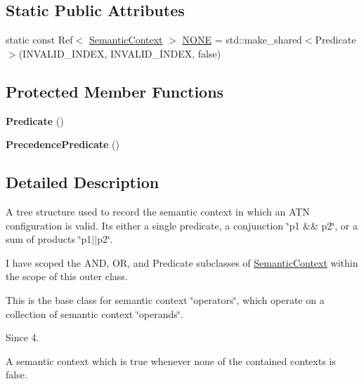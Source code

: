 \subsection*{Static Public Attributes}
\begin{DoxyCompactItemize}
\item 
static const Ref$<$ \hyperlink{classantlr4_1_1atn_1_1SemanticContext}{Semantic\+Context} $>$ \hyperlink{classantlr4_1_1atn_1_1SemanticContext_a1c9db994b89d06e9d8969e78050aeff5}{N\+O\+NE} = std\+::make\+\_\+shared$<$Predicate$>$(I\+N\+V\+A\+L\+I\+D\+\_\+\+I\+N\+D\+EX, I\+N\+V\+A\+L\+I\+D\+\_\+\+I\+N\+D\+EX, false)
\end{DoxyCompactItemize}
\subsection*{Protected Member Functions}
\begin{DoxyCompactItemize}
\item 
\mbox{\label{classantlr4_1_1atn_1_1SemanticContext_ae6b503f70a95cd1ddf8bdf8c95c3992c}} 
{\bfseries Predicate} ()
\item 
\mbox{\label{classantlr4_1_1atn_1_1SemanticContext_ae637856c52152446144e87c312da587a}} 
{\bfseries Precedence\+Predicate} ()
\end{DoxyCompactItemize}


\subsection{Detailed Description}
A tree structure used to record the semantic context in which an A\+TN configuration is valid. It\textquotesingle{}s either a single predicate, a conjunction \char`\"{}p1 \&\& p2\char`\"{}, or a sum of products \char`\"{}p1$\vert$$\vert$p2\char`\"{}.

I have scoped the A\+ND, OR, and Predicate subclasses of \hyperlink{classantlr4_1_1atn_1_1SemanticContext}{Semantic\+Context} within the scope of this outer class.

This is the base class for semantic context \char`\"{}operators\char`\"{}, which operate on a collection of semantic context \char`\"{}operands\char`\"{}.

\begin{DoxySince}{Since}
4.
\end{DoxySince}
A semantic context which is true whenever none of the contained contexts is false.

